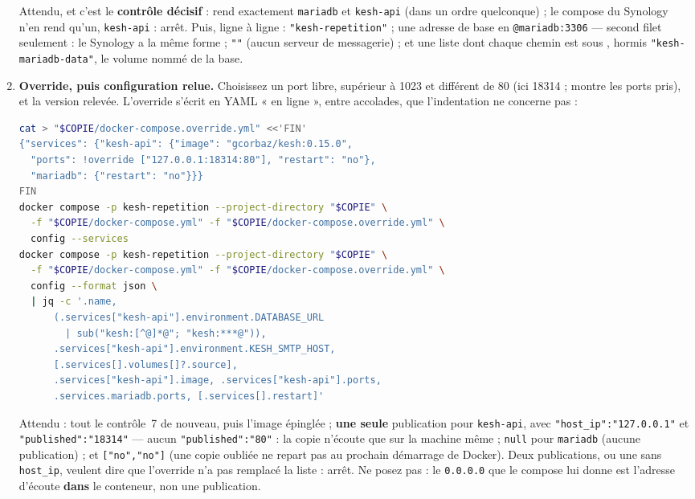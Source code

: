 \documentclass[a4paper,11pt,oneside]{article}
\begin{document}
\begin{enumerate}
    Attendu, et c'est le \textbf{contrôle décisif} :  rend exactement \texttt{mariadb} et \texttt{kesh-api} (dans un ordre quelconque) ; le compose du Synology n'en rend qu'un, \texttt{kesh-api} : arrêt. Puis, ligne à ligne : \texttt{"kesh-repetition"} ; une adresse de base en \texttt{@mariadb:3306} --- second filet seulement : le Synology a la même forme ; \texttt{""} (aucun serveur de messagerie) ; et une liste dont chaque chemin est sous , hormis \texttt{"kesh-mariadb-data"}, le volume nommé de la base.
    \item \textbf{Override, puis configuration relue.} Choisissez un port libre, supérieur à 1023 et différent de 80 (ici 18314 ;  montre les ports pris), et la version relevée. L'override s'écrit en YAML « en ligne », entre accolades, que l'indentation ne concerne pas :
\begin{lstlisting}[language=bash]
cat > "$COPIE/docker-compose.override.yml" <<'FIN'
{"services": {"kesh-api": {"image": "gcorbaz/kesh:0.15.0",
  "ports": !override ["127.0.0.1:18314:80"], "restart": "no"},
  "mariadb": {"restart": "no"}}}
FIN
docker compose -p kesh-repetition --project-directory "$COPIE" \
  -f "$COPIE/docker-compose.yml" -f "$COPIE/docker-compose.override.yml" \
  config --services
docker compose -p kesh-repetition --project-directory "$COPIE" \
  -f "$COPIE/docker-compose.yml" -f "$COPIE/docker-compose.override.yml" \
  config --format json \
  | jq -c '.name,
      (.services["kesh-api"].environment.DATABASE_URL
        | sub("kesh:[^@]*@"; "kesh:***@")),
      .services["kesh-api"].environment.KESH_SMTP_HOST,
      [.services[].volumes[]?.source],
      .services["kesh-api"].image, .services["kesh-api"].ports,
      .services.mariadb.ports, [.services[].restart]'
\end{lstlisting}
    Attendu : tout le contrôle~7 de nouveau, puis l'image épinglée ; \textbf{une seule} publication pour \texttt{kesh-api}, avec \texttt{"host\_ip":"127.0.0.1"} et \texttt{"published":"18314"} --- aucun \texttt{"published":"80"} : la copie n'écoute que sur la machine même ; \texttt{null} pour \texttt{mariadb} (aucune publication) ; et \texttt{["no","no"]} (une copie oubliée ne repart pas au prochain démarrage de Docker). Deux publications, ou une sans \texttt{host\_ip}, veulent dire que l'override n'a pas remplacé la liste : arrêt. Ne posez pas  : le \texttt{0.0.0.0} que le compose lui donne est l'adresse d'écoute \textbf{dans} le conteneur, non une publication.

\end{enumerate}
\end{document}
